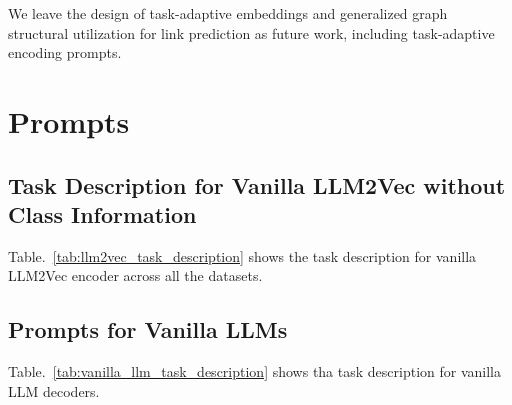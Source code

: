 We leave the design of task-adaptive embeddings and generalized graph structural utilization for link prediction as future work, including task-adaptive encoding prompts.







\section{Prompts}
\subsection{Task Description for Vanilla LLM2Vec without Class Information}
\label{sec:app_prompt_llm2vec_task_description}
Table.~\ref{tab:llm2vec_task_description} shows the task description for vanilla LLM2Vec encoder across all the datasets.


\subsection{Prompts for Vanilla LLMs}
\label{sec:app_prompt_vanilla_llm}
Table.~\ref{tab:vanilla_llm_task_description} shows tha task description for vanilla LLM decoders.



\newpage


%

%

%
%
%
%
%
%
